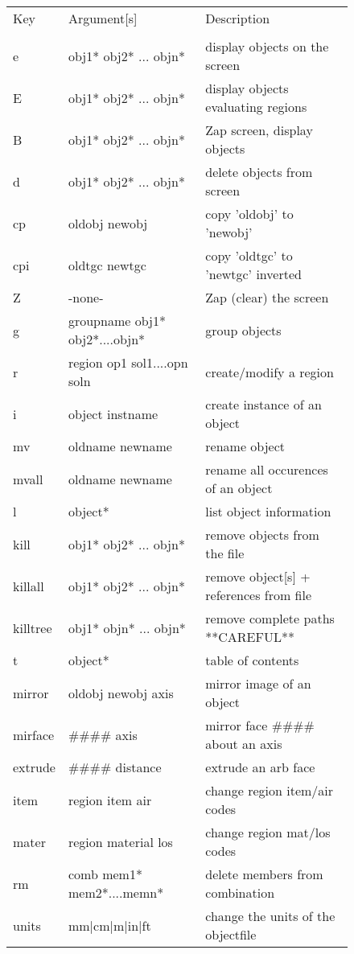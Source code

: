 \begin{figure}[tb]
\begin{tabular}{l l l}
Key	& Argument[s]	& Description \\
\\
  e	& obj1* obj2* ... objn*	& display objects on the screen \\
  E	& obj1* obj2* ... objn*	& display objects evaluating regions \\
  B	& obj1* obj2* ... objn*	& Zap screen, display objects \\
  d	& obj1* obj2* ... objn*	& delete objects from screen \\
  cp	& oldobj newobj	& copy 'oldobj' to 'newobj' \\
  cpi	& oldtgc newtgc	& copy 'oldtgc' to 'newtgc' inverted \\
  Z	& -none-	& Zap (clear) the screen \\
  g	& groupname obj1* obj2*....objn*	& group objects \\
  r	& region op1 sol1....opn soln	& create/modify a region \\
  i	& object instname	& create instance of an object \\
  mv	& oldname newname	& rename object \\
  mvall	& oldname newname	& rename all occurences of an object \\
  l	& object*	& list object information \\
  kill	& obj1* obj2* ... objn*	& remove objects from the file \\
  killall	& obj1* obj2* ... objn*	& remove object[s] + references from file \\
  killtree	& obj1* objn* ... objn*	& remove complete paths  **CAREFUL** \\
  t	& object*	& table of contents \\
  mirror	& oldobj newobj axis	& mirror image of an object \\
  mirface	& \#\#\#\# axis	& mirror face \#\#\#\# about an axis \\
  extrude	& \#\#\#\# distance	& extrude an arb face \\
  item	& region item air	& change region item/air codes \\
  mater	& region material los	& change region mat/los codes \\
  rm	& comb mem1* mem2*....memn*	& delete members from combination \\
  units	& mm|cm|m|in|ft	& change the units of the objectfile \\

\end{tabular}
\end{figure}
